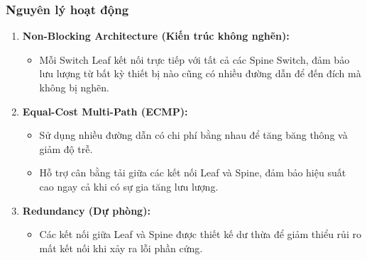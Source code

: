 \documentclass[13pt]{article}
\begin{document}
\subsubsection{Nguyên lý hoạt động}
\begin{enumerate}
    \item \textbf{Non-Blocking Architecture (Kiến trúc không nghẽn):}
    \begin{itemize}
        \item Mỗi Switch Leaf kết nối trực tiếp với tất cả các Spine Switch, đảm bảo lưu lượng từ bất kỳ thiết bị nào cũng có nhiều đường dẫn để đến đích mà không bị nghẽn.
    \end{itemize}

    \item \textbf{Equal-Cost Multi-Path (ECMP):}
    \begin{itemize}
        \item Sử dụng nhiều đường dẫn có chi phí bằng nhau để tăng băng thông và giảm độ trễ.
        \item Hỗ trợ cân bằng tải giữa các kết nối Leaf và Spine, đảm bảo hiệu suất cao ngay cả khi có sự gia tăng lưu lượng.
    \end{itemize}

    \item \textbf{Redundancy (Dự phòng):}
    \begin{itemize}
        \item Các kết nối giữa Leaf và Spine được thiết kế dư thừa để giảm thiểu rủi ro mất kết nối khi xảy ra lỗi phần cứng.
    \end{itemize}
\end{enumerate}
\end{document}
